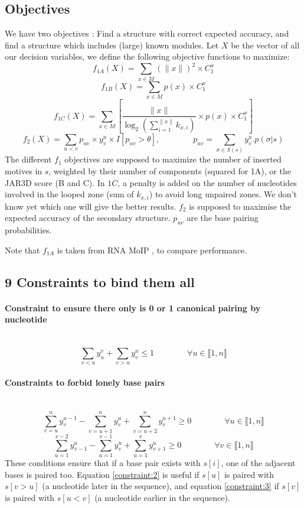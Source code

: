 \documentclass{article}
\begin{document}
\subsection{Objectives \label{objectives}}
We have two objectives : Find a structure with correct expected accuracy, and find a structure which includes (large) known modules.
Let $X$ be the vector of all our decision variables, we define the following objective functions to maximize:
\[ f_{1A}(X) = \sum_{x \in M} (\|x\|)^2 \times C^x_1  \]
\[ f_{1B}(X) = \sum_{x \in M} p(x) \times C^x_1 \]
\[ f_{1C}(X) = \sum_{x \in M} \left[ \frac{\|x\|}{\log_2(\sum_{i=1}^{\|x\|}k_{x,i})} \times p(x) \times C^x_1 \right]\]
$$ f_2(X) = \sum_{u<v} p_{uv}\times y^u_v \times I[p_{uv}>\theta], \qquad \qquad
p_{uv} = \sum_{\sigma \in S(s)} y^u_v.p(\sigma | s)$$
The different $f_1$ objectives are supposed to maximize the number of inserted motives in $s$, 
weighted by their number of components (squared for 1A), or the JAR3D score (B and C). 
In $1C$, a penalty is added on the number of nucleotides involved in the looped zone (sum of $k_{x,i}$) to avoid long unpaired zones. 
We don't know yet which one will give the better results.
$f_2$ is supposed to maximise the expected accuracy of the secondary structure. 
$p_{uv}$ are the base pairing probabilities.

Note that \(f_{1A}\) is taken from RNA MoIP \cite{reinharz_towards_2012}, to compare performance.

\subsection{9 Constraints to bind them all}
\paragraph{Constraint to ensure there only is 0 or 1 canonical pairing by nucleotide} ~ 
\begin{equation} \label{constraint:1}
	\sum_{v<u} y^v_u + \sum_{v>u} y^u_v \leq 1 \qquad\qquad \forall u \in \llbracket 1,n \rrbracket
\end{equation}
	
\paragraph{Constraints to forbid lonely base pairs} ~
\begin{equation} \label{constraint:2}
	\sum_{v=u}^n y^{u-1}_v - \sum_{v=u+1}^n y^u_v + \sum_{v=u+2}^n y^{u+1}_v \geq 0 \qquad \qquad \forall u \in \llbracket 1,n\rrbracket
\end{equation}
\begin{equation} \label{constraint:3}
	\sum_{u=1}^{v-2} y^u_{v-1} - \sum_{u=1}^{v-1} y^u_v + \sum_{u=1}^{v} y^u_{v+1} \geq 0 \qquad \qquad \forall v \in \llbracket 1,n\rrbracket
\end{equation}
These conditions ensure that if a base pair exists with $s[i]$, 
one of the adjacent bases is paired too. 
Equation \ref{constraint:2} is useful if $s[u]$ is paired with $s[v>u]$ (a nucleotide later in the sequence), 
and equation \ref{constraint:3} if $s[v]$ is paired with $s[u<v]$ (a nucleotide earlier in the sequence).
	
\end{document}
